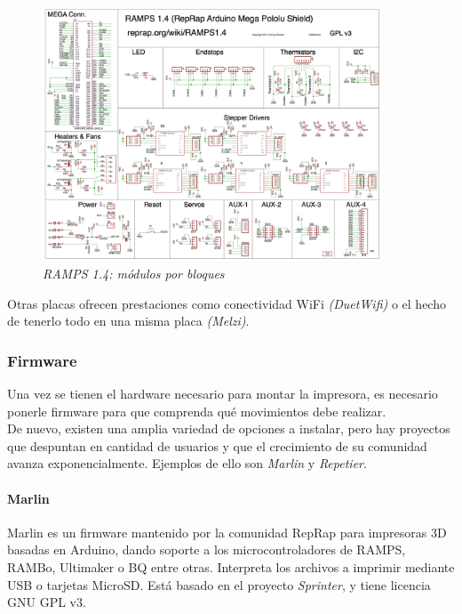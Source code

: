 \documentclass[a4paper,12pt]{article}
\begin{document}
	
	\begin{figure}[!ht]
	\begin{center}
	  \includegraphics[width=0.9\textwidth]{Figuras/RAMPS_14_schematic.png}
	  \caption{\emph{RAMPS 1.4: módulos por bloques}}
	\end{center}
	\label{RAMPS_schematic}
	\end{figure}

Otras placas ofrecen prestaciones como conectividad WiFi \emph{(DuetWifi)} o el hecho de tenerlo todo en una misma placa \emph{(Melzi)}.\\


\subsubsection{Firmware}
Una vez se tienen el hardware necesario para montar la impresora, es necesario ponerle firmware para que comprenda qué movimientos debe realizar.\\

De nuevo, existen una amplia variedad de opciones a instalar, pero hay proyectos que despuntan en cantidad de usuarios y que el crecimiento de su comunidad avanza exponencialmente. Ejemplos de ello son \emph{Marlin} y \emph{Repetier}.\\

\paragraph{Marlin}
Marlin es un firmware mantenido por la comunidad RepRap para impresoras 3D basadas en Arduino, dando soporte a los microcontroladores de RAMPS, RAMBo, Ultimaker o BQ entre otras. Interpreta los archivos a imprimir mediante USB o tarjetas MicroSD. Está basado en el proyecto \emph{Sprinter}, y tiene licencia GNU GPL v3.\\
\end{document}
